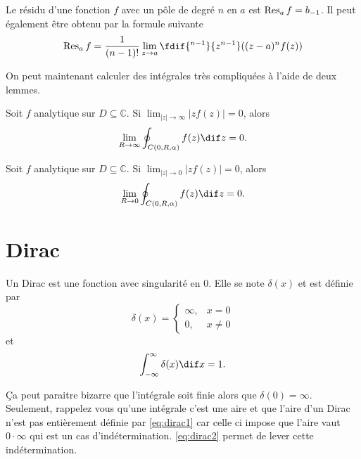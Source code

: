 \begin{mydef} 
  Le résidu d'une fonction $f$ avec un pôle de degré $n$ en $a$ est
  $\operatorname{Res}_a f = b_{-1}$.
  Il peut également être obtenu par la formule suivante
  \[ \res_a f = \frac{1}{(n-1)!} \lim_{z \to a}
  \fdif{^{n-1}}{z^{n-1}}((z-a)^nf(z)) \]
\end{mydef}

On peut maintenant calculer des intégrales très compliquées à l'aide de
deux lemmes.
\begin{mylem}
  Soit $f$ analytique sur $D \subseteq \mathbb{C}$.
  Si $\lim_{|z|\to\infty} |zf(z)| = 0$, alors
  \[ \lim_{R\to\infty} \oint_{C(0,R,\alpha)}f(z)\dif z = 0. \]
\end{mylem}
\begin{mylem}
  Soit $f$ analytique sur $D \subseteq \mathbb{C}$.
  Si $\lim_{|z|\to 0} |zf(z)| = 0$, alors
  \[ \lim_{R\to 0} \oint_{C(0,R,\alpha)}f(z)\dif z = 0. \]
\end{mylem}

\annexe
\section{Dirac}
\label{app:dirac}
Un Dirac est une fonction avec singularité en 0.
Elle se note $\delta(x)$ et est définie par
\begin{equation}
  \label{eq:dirac1}
  \delta(x) =
  \begin{cases}
    \infty, & x = 0\\
    0, & x \neq 0
  \end{cases}
\end{equation}
et
\begin{equation}
  \label{eq:dirac2}
  \int_{-\infty}^{\infty} \delta(x) \dif x = 1.
\end{equation}

Ça peut paraitre bizarre que l'intégrale soit finie alors que
$\delta(0) = \infty$.
Seulement, rappelez vous qu'une intégrale c'est une aire et que
l'aire d'un Dirac n'est pas entièrement définie par \eqref{eq:dirac1}
car celle ci impose que l'aire vaut $0 \cdot \infty$ qui est un cas
d'indétermination.
\eqref{eq:dirac2} permet de lever cette indétermination.


